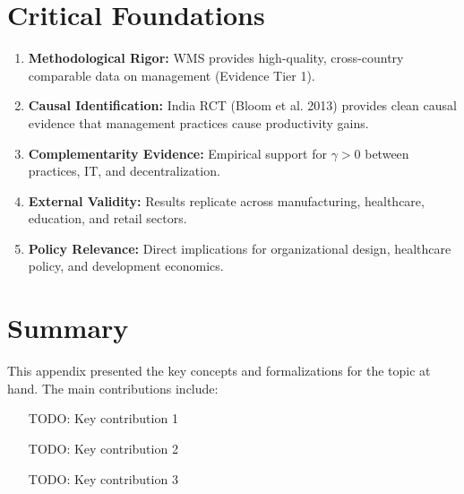 \section{Critical Foundations}

\begin{enumerate}
    \item \textbf{Methodological Rigor:} WMS provides high-quality, cross-country
    comparable data on management (Evidence Tier 1).

    \item \textbf{Causal Identification:} India RCT (Bloom et al. 2013) provides
    clean causal evidence that management practices cause productivity gains.

    \item \textbf{Complementarity Evidence:} Empirical support for $\gamma > 0$
    between practices, IT, and decentralization.

    \item \textbf{External Validity:} Results replicate across manufacturing,
    healthcare, education, and retail sectors.

    \item \textbf{Policy Relevance:} Direct implications for organizational
    design, healthcare policy, and development economics.
\end{enumerate}


\section{Summary}
\label{sec:summary}

This appendix presented the key concepts and formalizations for the topic at hand.
The main contributions include:

\begin{itemize}
    \item [TODO: Key contribution 1]
    \item [TODO: Key contribution 2]
    \item [TODO: Key contribution 3]
\end{itemize}

